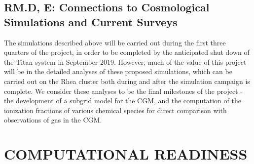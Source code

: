 \documentclass[11pt,letterpaper,english]{article}
\begin{document}
\vspace{-.25in}
\subsection{RM.D, E: Connections to Cosmological Simulations and Current Surveys}
\vspace{-.2in}

The simulations described above will be carried out during the first three quarters of the project, in order to be completed by the anticipated shut down of the Titan system in September 2019. However, much of the value of this project will be in the detailed analyses of these proposed simulations, which can be carried out on the Rhea cluster both during and after the simulation campaign is complete. We consider these analyses to be the final milestones of the project - the development of a subgrid model for the CGM, and the computation of the ionization fractions of various chemical species for direct comparison with observations of gas in the CGM.


\vspace{-.25in}
\section{COMPUTATIONAL READINESS}
\vspace{-.2in}

\end{document}
